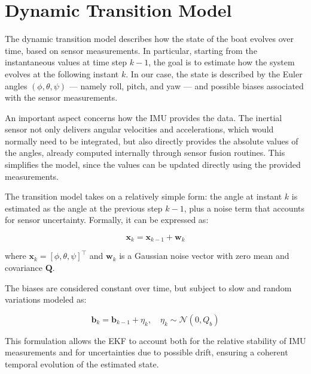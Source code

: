 \section{Dynamic Transition Model}

The dynamic transition model describes how the state of the boat evolves over time, based on sensor measurements. In particular, starting from the instantaneous values at time step $k-1$, the goal is to estimate how the system evolves at the following instant $k$. In our case, the state is described by the Euler angles $(\phi, \theta, \psi)$ — namely roll, pitch, and yaw — and possible biases associated with the sensor measurements.  

An important aspect concerns how the IMU provides the data. The inertial sensor not only delivers angular velocities and accelerations, which would normally need to be integrated, but also directly provides the absolute values of the angles, already computed internally through sensor fusion routines. This simplifies the model, since the values can be updated directly using the provided measurements.  

The transition model takes on a relatively simple form: the angle at instant $k$ is estimated as the angle at the previous step $k-1$, plus a noise term that accounts for sensor uncertainty. Formally, it can be expressed as:  

\[
\mathbf{x}_k = \mathbf{x}_{k-1} + \mathbf{w}_k
\]

where $\mathbf{x}_k = [\phi, \theta, \psi]^\top$ and $\mathbf{w}_k$ is a Gaussian noise vector with zero mean and covariance $\mathbf{Q}$.  

The biases are considered constant over time, but subject to slow and random variations modeled as:  

\[
\mathbf{b}_k = \mathbf{b}_{k-1} + \eta_k, \quad \eta_k \sim \mathcal{N}(0, Q_b)
\]

This formulation allows the EKF to account both for the relative stability of IMU measurements and for uncertainties due to possible drift, ensuring a coherent temporal evolution of the estimated state.  
